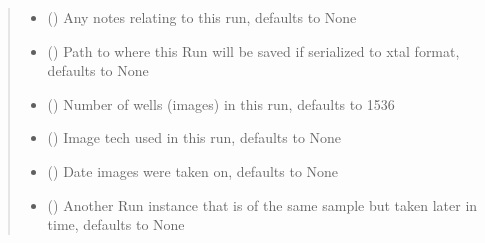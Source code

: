 \documentclass[letterpaper,10pt,english]{sphinxmanual}
\begin{document}
\begin{fulllineitems}
\begin{fulllineitems}
\begin{quote}
\begin{description}
\begin{itemize}
\item {} 
 (\sphinxstyleliteralemphasis{\sphinxupquote{, }}) \textendash{} Any notes relating to this run, defaults to None

\item {} 
 (\sphinxstyleliteralemphasis{\sphinxupquote{, }}) \textendash{} Path to where this Run will be saved if 
serialized to xtal format, defaults to None

\item {} 
 (\sphinxstyleliteralemphasis{\sphinxupquote{, }}) \textendash{} Number of wells (images) in this run, defaults to 1536

\item {} 
 (\sphinxstyleliteralemphasis{\sphinxupquote{, }}) \textendash{} Image tech used in this run, defaults to None

\item {} 
 (\sphinxstyleliteralemphasis{\sphinxupquote{, }}) \textendash{} Date images were taken on, defaults to None

\item {} 
 ({\hyperref[\detokenize{polo.crystallography:polo.crystallography.run.Run}]{}}\sphinxstyleliteralemphasis{\sphinxupquote{, }}) \textendash{} Another Run instance that is of the same sample but 
taken later in time, defaults to None


\end{itemize}
\end{description}
\end{quote}
\end{fulllineitems}
\end{fulllineitems}
\end{document}
